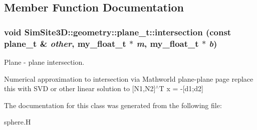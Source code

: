 \subsection{Member Function Documentation}
\subsubsection{\setlength{\rightskip}{0pt plus 5cm}void SimSite3D::geometry::plane\_\-t::intersection (const \bf{plane\_\-t} \& {\em other}, my\_\-float\_\-t $\ast$ {\em m}, my\_\-float\_\-t $\ast$ {\em b})\hspace{0.3cm}{\tt  [inline]}}\label{classSimSite3D_1_1geometry_1_1plane__t_aad5de4249d5e30464f69e0280f62fd3}


Plane - plane intersection. 

Numerical approximation to intersection via Mathworld plane-plane page replace this with SVD or other linear solution to [N1,N2]$^\wedge$T x = -[d1;d2] 

The documentation for this class was generated from the following file:\begin{CompactItemize}
\item 
sphere.H\end{CompactItemize}
